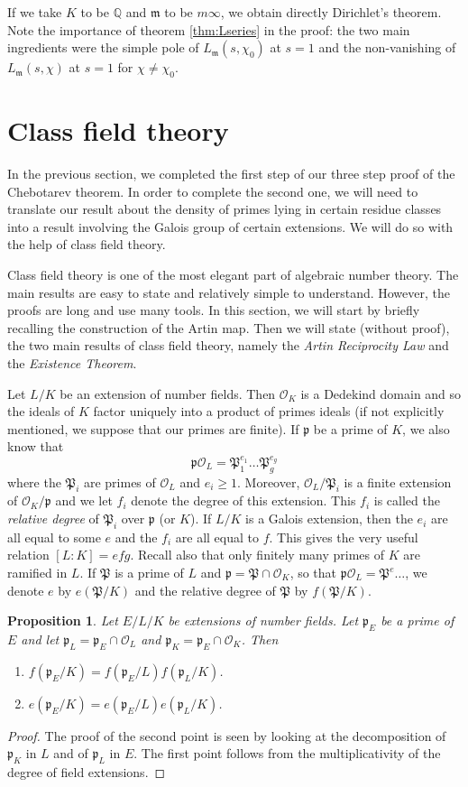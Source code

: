 \documentclass[]{amsart}
\newtheorem{prop}{Proposition}
\newcommand{\Q}{\mathbb{Q}}
\newcommand{\m}{\mathfrak{m}}
\newcommand{\OK}{\mathcal{O}_K}
\newcommand{\OL}{\mathcal{O}_L}
\newcommand{\Lms}{L_\mathfrak{m}(s,\chi)}
\newcommand{\p}{\mathfrak{p}}
\renewcommand{\P}{\mathfrak{P}}
\begin{document}
		If we take $K$ to be $\Q$ and $\m$ to be $m\infty$, we obtain directly Dirichlet's theorem. Note the importance of theorem \ref{thm:Lseries} in the proof: the two main ingredients were the simple pole of $L_\m(s,\chi_0)$ at $s=1$ and the non-vanishing of $\Lms$ at $s=1$ for $\chi\neq\chi_0$.
		
		\section{Class field theory}
		In the previous section, we completed the first step of our three step proof of the Chebotarev theorem. In order to complete the second one, we will need to translate our result about the density of primes lying in certain residue classes into a result involving the Galois group of certain extensions. We will do so with the help of class field theory. 
		
		Class field theory is one of the most elegant part of algebraic number theory. The main results are easy to state and relatively simple to understand. However, the proofs are long and use many tools. In this section, we will start by briefly recalling the construction of the Artin map. Then we will state (without proof), the two main results of class field theory, namely the \emph{Artin Reciprocity Law} and the \emph{Existence Theorem}.
		
		Let $L/K$ be an extension of number fields. Then $\OK$ is a Dedekind domain and so the ideals of $K$ factor uniquely into a product of primes ideals (if not explicitly mentioned, we suppose that our primes are finite).  If $\p$ be a prime of $K$, we also know that
		\[\p\OL=\P_1^{e_1}\dots\P_g^{e_g}\]
		where the $\P_i$ are primes of $\OL$ and $e_i\geq 1$. Moreover, $\OL/\P_i$ is a finite extension of $\OK/\p$ and we let $f_i$ denote the degree of this extension. This $f_i$ is called the \emph{relative degree} of $\P_i$ over $\p$ (or $K$). If $L/K$ is a Galois extension, then the $e_i$ are all equal to some $e$ and the $f_i$ are all equal to $f$. This gives the very useful relation $[L:K]=efg$. Recall also that only finitely many primes of $K$ are ramified in $L$. If $\P$ is a prime of $L$ and $\p=\P\cap\OK$, so that $\p\OL=\P^{e}\dots$, we denote $e$ by $e(\P/K)$ and the relative degree of $\P$ by $f(\P/K)$. 
		
		\begin{prop}
			Let $E/L/K$ be extensions of number fields. Let $\p_E$ be a prime of $E$ and let $\p_L=\p_E\cap\OL$ and $\p_K=\p_E\cap\OK$. Then 
			\begin{enumerate}
				\item $f(\p_E/K)=f(\p_E/L)f(\p_L/K)$.
				\item $e(\p_E/K)=e(\p_E/L)e(\p_L/K)$.
			\end{enumerate}
		\end{prop}
		\begin{proof}
			The proof of the second point is seen by looking at the decomposition of $\p_K$ in $L$ and of $\p_L$ in $E$. The first point follows from the multiplicativity of the degree of field extensions.
		\end{proof}
		
\end{document}
